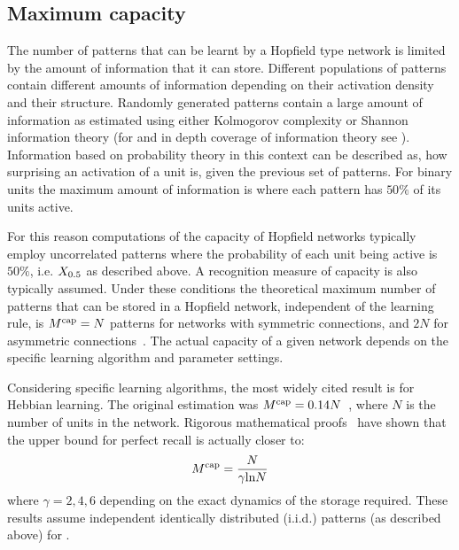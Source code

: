 

\subsection{Maximum capacity}   %
\label{sec:capacity}


The number of patterns that can be learnt by a Hopfield type network is limited by the amount of information that it can store. Different populations of patterns contain different amounts of information depending on their activation density and their structure. Randomly generated patterns contain a large amount of information as estimated using either Kolmogorov complexity or Shannon information theory (for and in depth coverage of information theory see \citet{Cover1991}). Information based on probability theory in this context can be described as, how surprising an activation of a unit is, given the previous set of patterns.  For binary units the maximum amount of information is where each pattern has $50\%$ of its units active.

For this reason computations of the capacity of Hopfield networks typically employ uncorrelated patterns where the probability of each unit being active is $50\%$, i.e. $X_{0.5}$ as described above.  A recognition measure of capacity is also typically assumed.  Under these conditions the theoretical maximum number of patterns that can be stored in a Hopfield network, independent of the learning rule, is $M^{\mathrm{cap}}=N$ patterns for networks with symmetric connections, and $2N$ for asymmetric connections~\citep{Gardner1988}.  The actual capacity of a given network depends on the specific learning algorithm and parameter settings.  
 
Considering specific learning algorithms, the most widely cited result is for Hebbian learning.  The original estimation was $M^{\mathrm{cap}} = 0.14N$~\citep{Amit1987}, where $N$ is the number of units in the network. Rigorous mathematical proofs~\citep{McEliece1987,Bovier1999,Lowe2005} have shown that the upper bound for perfect recall is actually closer to:
\begin{equation}
\label{eq:HopnetcapHebbian}
	M^{\mathrm{cap}} = \frac{N}{\gamma \mbox{ln} N}
\end{equation}
where $\gamma = 2,4,6$ depending on the exact dynamics of the storage required.  These results assume independent identically distributed (i.i.d.) patterns (as described above) for .  

